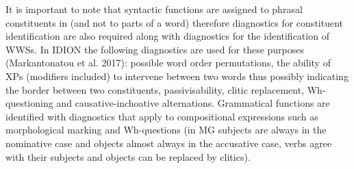 \documentclass[output=paper,
modfonts
]{langscibook}
\begin{document}
It\ili{} is\ili{} important\ili{} to\ili{} note\ili{} that\ili{} syntactic\ili{} functions\ili{} are\ili{} assigned\ili{} to\ili{} phrasal\ili{} constituents\ili{} in\ili{} \ili{}\ili{}\ili{} \ili{}(and\ili{} not\ili{} to\ili{} parts\ili{} of\ili{} a\ili{} word\ili{})\ili{} therefore\ili{} diagnostics\ili{} for\ili{} constituent\ili{} identification\ili{} are\ili{} also\ili{} required\ili{} along\ili{} with\ili{} diagnostics\ili{} for\ili{} the\ili{} identification\ili{} of\ili{} WWSs\ili{}.\ili{} \ili{} In\ili{} IDION\ili{} the\ili{} following\ili{} diagnostics\ili{} are\ili{} used\ili{} for\ili{} these\ili{} purposes\ili{} \ili{}(Markantonatou\ili{} et\ili{} al\ili{}.\ili{} 2017\ili{})\ili{}:\ili{} possible\ili{} word\ili{} order\ili{} permutations\ili{},\ili{} the\ili{} ability\ili{} of\ili{} XPs\ili{} \ili{}(modifiers\ili{} included\ili{})\ili{} to\ili{} intervene\ili{} between\ili{} two\ili{} words\ili{} thus\ili{} possibly\ili{} indicating\ili{} the\ili{} border\ili{} between\ili{} two\ili{} constituents\ili{},\ili{} passivisability\ili{},\ili{} clitic\ili{} replacement\ili{},\ili{} Wh\ili{}-questioning\ili{} and\ili{} causative\ili{}-inchoative\ili{} alternations\ili{}.\ili{} Grammatical\ili{} functions\ili{} are\ili{} identified\ili{} with\ili{} diagnostics\ili{} that\ili{} apply\ili{} to\ili{} compositional\ili{} expressions\ili{} such\ili{} as\ili{} morphological\ili{} marking\ili{} and\ili{} Wh\ili{}-questions\ili{} \ili{}(in\ili{} MG\ili{} subjects\ili{} are\ili{} always\ili{} in\ili{} the\ili{} nominative\ili{} case\ili{} and\ili{} objects\ili{} almost\ili{} always\ili{} in\ili{} the\ili{} accusative\ili{} case\ili{},\ili{} verbs\ili{} agree\ili{} with\ili{} their\ili{} subjects\ili{} and\ili{} objects\ili{} can\ili{} be\ili{} replaced\ili{} by\ili{} clitics\ili{})\ili{}.\ili{}
\ili{}
\end{document}
